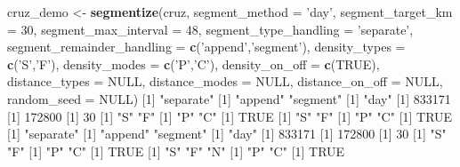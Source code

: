 \documentclass[
]{book}
\newenvironment{Shaded}{\begin{snugshade}}{\end{snugshade}}
\newcommand{\DataTypeTok}[1]{\textcolor[rgb]{0.13,0.29,0.53}{#1}}
\newcommand{\DecValTok}[1]{\textcolor[rgb]{0.00,0.00,0.81}{#1}}
\newcommand{\KeywordTok}[1]{\textcolor[rgb]{0.13,0.29,0.53}{\textbf{#1}}}
\newcommand{\NormalTok}[1]{#1}
\newcommand{\OtherTok}[1]{\textcolor[rgb]{0.56,0.35,0.01}{#1}}
\newcommand{\StringTok}[1]{\textcolor[rgb]{0.31,0.60,0.02}{#1}}
\begin{document}
\begin{Shaded}
\begin{Highlighting}[]
\NormalTok{cruz_demo <-}\StringTok{ }\KeywordTok{segmentize}\NormalTok{(cruz,}
                        \DataTypeTok{segment_method =} \StringTok{'day'}\NormalTok{,}
                        \DataTypeTok{segment_target_km =} \DecValTok{30}\NormalTok{,}
                        \DataTypeTok{segment_max_interval =} \DecValTok{48}\NormalTok{,}
                        \DataTypeTok{segment_type_handling =} \StringTok{'separate'}\NormalTok{,}
                        \DataTypeTok{segment_remainder_handling =} \KeywordTok{c}\NormalTok{(}\StringTok{'append'}\NormalTok{,}\StringTok{'segment'}\NormalTok{),}
                        \DataTypeTok{density_types =} \KeywordTok{c}\NormalTok{(}\StringTok{'S'}\NormalTok{,}\StringTok{'F'}\NormalTok{),}
                        \DataTypeTok{density_modes =} \KeywordTok{c}\NormalTok{(}\StringTok{'P'}\NormalTok{,}\StringTok{'C'}\NormalTok{),}
                        \DataTypeTok{density_on_off =} \KeywordTok{c}\NormalTok{(}\OtherTok{TRUE}\NormalTok{),}
                        \DataTypeTok{distance_types =} \OtherTok{NULL}\NormalTok{,}
                        \DataTypeTok{distance_modes =} \OtherTok{NULL}\NormalTok{,}
                        \DataTypeTok{distance_on_off =} \OtherTok{NULL}\NormalTok{,}
                        \DataTypeTok{random_seed =} \OtherTok{NULL}\NormalTok{)}
\NormalTok{[}\DecValTok{1}\NormalTok{] }\StringTok{"separate"}
\NormalTok{[}\DecValTok{1}\NormalTok{] }\StringTok{"append"}  \StringTok{"segment"}
\NormalTok{[}\DecValTok{1}\NormalTok{] }\StringTok{"day"}
\NormalTok{[}\DecValTok{1}\NormalTok{] }\DecValTok{833171}
\NormalTok{[}\DecValTok{1}\NormalTok{] }\DecValTok{172800}
\NormalTok{[}\DecValTok{1}\NormalTok{] }\DecValTok{30}
\NormalTok{[}\DecValTok{1}\NormalTok{] }\StringTok{"S"} \StringTok{"F"}
\NormalTok{[}\DecValTok{1}\NormalTok{] }\StringTok{"P"} \StringTok{"C"}
\NormalTok{[}\DecValTok{1}\NormalTok{] }\OtherTok{TRUE}
\NormalTok{[}\DecValTok{1}\NormalTok{] }\StringTok{"S"} \StringTok{"F"}
\NormalTok{[}\DecValTok{1}\NormalTok{] }\StringTok{"P"} \StringTok{"C"}
\NormalTok{[}\DecValTok{1}\NormalTok{] }\OtherTok{TRUE}
\NormalTok{[}\DecValTok{1}\NormalTok{] }\StringTok{"separate"}
\NormalTok{[}\DecValTok{1}\NormalTok{] }\StringTok{"append"}  \StringTok{"segment"}
\NormalTok{[}\DecValTok{1}\NormalTok{] }\StringTok{"day"}
\NormalTok{[}\DecValTok{1}\NormalTok{] }\DecValTok{833171}
\NormalTok{[}\DecValTok{1}\NormalTok{] }\DecValTok{172800}
\NormalTok{[}\DecValTok{1}\NormalTok{] }\DecValTok{30}
\NormalTok{[}\DecValTok{1}\NormalTok{] }\StringTok{"S"} \StringTok{"F"}
\NormalTok{[}\DecValTok{1}\NormalTok{] }\StringTok{"P"} \StringTok{"C"}
\NormalTok{[}\DecValTok{1}\NormalTok{] }\OtherTok{TRUE}
\NormalTok{[}\DecValTok{1}\NormalTok{] }\StringTok{"S"} \StringTok{"F"} \StringTok{"N"}
\NormalTok{[}\DecValTok{1}\NormalTok{] }\StringTok{"P"} \StringTok{"C"}
\NormalTok{[}\DecValTok{1}\NormalTok{] }\OtherTok{TRUE}


\end{Highlighting}
\end{Shaded}
\end{document}
